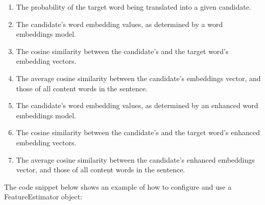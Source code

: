 \begin{itemize}
\begin{enumerate}
	\item The probability of the target word being translated into a given candidate.
	\item The candidate's word embedding values, as determined by a word embeddings model.
	\item The cosine similarity between the candidate's and the target word's embedding vectors.
	\item The average cosine similarity between the candidate's embeddings vector, and those of all content words in the sentence.
	\item The candidate's word embedding values, as determined by an enhanced word embeddings model.
	\item The cosine similarity between the candidate's and the target word's enhanced embedding vectors.
	\item The average cosine similarity between the candidate's enhanced embeddings vector, and those of all content words in the sentence.
\end{enumerate}

\end{itemize}

The code snippet below shows an example of how to configure and use a FeatureEstimator object:

